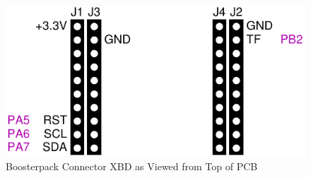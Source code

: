 \documentclass{article}
\begin{document}
\begin{figure}[ht]
  \begin{center}
    \includegraphics[scale=1]{figures/xbp-xbd}
    \caption{Boosterpack Connector XBD as Viewed from Top of PCB}
  \end{center}
\end{figure}
\end{document}
